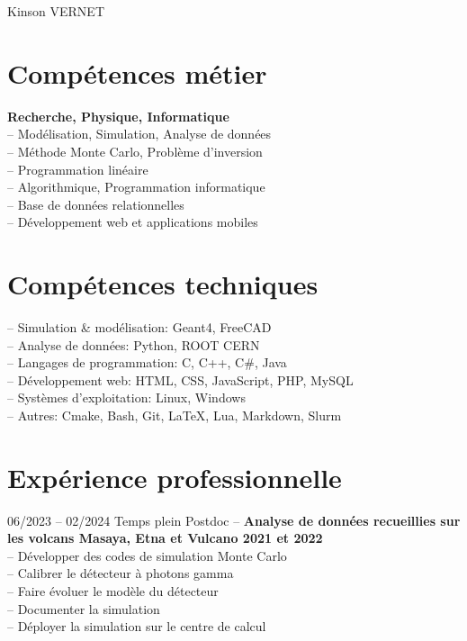 \documentclass[
	10pt,
]{FreemanCV}
\begin{document}
\begin{paracol}{2}

\parbox[][0.11\textheight][c]{\linewidth}{
	\centering
	{\sffamily\Huge Kinson VERNET}
}


\section{Comp\'etences m\'etier}

\jobentry
	{}
	{}
	{}
	{}
	{\textbf{Recherche, Physique, Informatique}}\\
	{	
	-- Mod\'elisation, Simulation, Analyse de donn\'ees\\
	-- M\'ethode Monte Carlo, Problème d’inversion\\
	-- Programmation lin\'eaire\\
	-- Algorithmique, Programmation informatique\\
	-- Base de donn\'ees relationnelles\\
	-- D\'eveloppement web et applications mobiles
	}
\medskip


\section{Comp\'etences techniques}

\jobentry
	{}
	{}
	{}
	{}
	{
	-- Simulation \& mod\'elisation: Geant4, FreeCAD\\
	-- Analyse de donn\'ees: Python, ROOT CERN\\
	-- Langages de programmation: C, C++, C\#, Java\\
	-- D\'eveloppement web: HTML, CSS, JavaScript, PHP, MySQL\\
	-- Systèmes d'exploitation: Linux, Windows\\
	-- Autres: Cmake, Bash, Git, LaTeX, Lua, Markdown, Slurm
	}
\medskip


\section{Exp\'erience professionnelle}

\jobentry
	{06/2023 -- 02/2024}
	{Temps plein}
	{Postdoc -- \uca}
	{}
	{\textbf{Analyse de donn\'ees recueillies sur les volcans Masaya, Etna et Vulcano 2021 et 2022}}\\
	{
	-- Développer des codes de simulation Monte Carlo\\
	-- Calibrer le détecteur à photons gamma\\
	-- Faire évoluer le modèle du détecteur\\
	-- Documenter la simulation\\
	-- Déployer la simulation sur le centre de calcul
	}
\medskip
\medskip


\end{paracol}
\end{document}
